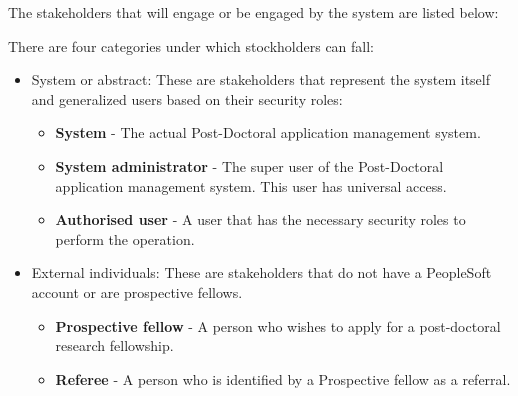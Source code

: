 \documentclass[12pt]{article}
\begin{document}
The stakeholders that will engage or be engaged by the system are listed below:

There are four categories under which stockholders can fall:
\begin{itemize}	
\item System or abstract:
These are stakeholders that represent the system itself and generalized users based on their security roles:
\begin{itemize}
\item \textbf{System} - The actual Post-Doctoral application management system.
\item \textbf{System administrator} - The super user of the Post-Doctoral application management system. This user has universal access.
\item \textbf{Authorised user} - A user that has the necessary security roles to perform the operation.
\end{itemize}
\item External individuals:
These are stakeholders that do not have a PeopleSoft account or are prospective fellows.
\begin{itemize}	
\item \textbf{Prospective fellow} - A person who wishes to apply for a post-doctoral research fellowship.
\item \textbf{Referee} - A person who is identified by a Prospective fellow as a referral.
\end{itemize}


\end{itemize}
\end{document}
